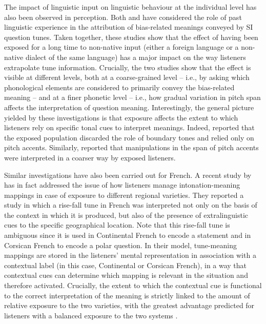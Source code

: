 \documentclass[output=paper,colorlinks,citecolor=brown]{langscibook}
\begin{document}
The impact of linguistic input on linguistic behaviour at the individual level has also been observed in perception. Both \citet{Orrico+2020} and \citet{orrico2022} have considered the role of past linguistic experience in the attribution of bias-related meanings conveyed by SI question tunes. Taken together, these studies show that the effect of having been exposed for a long time to non-native input (either a foreign language or a non-native dialect of the same language) has a major impact on the way listeners extrapolate tune information. Crucially, the two studies show that the effect is visible at different levels, both at a coarse-grained level – i.e., by asking which phonological elements are considered to primarily convey the bias-related meaning – and at a finer phonetic level – i.e., how gradual variation in pitch span affects the interpretation of question meaning. Interestingly, the general picture yielded by these investigations is that exposure affects the extent to which listeners rely on specific tonal cues to interpret meanings. Indeed, \citet{orrico2022} reported that the exposed population discarded the role of boundary tones and relied only on pitch accents. Similarly, \citet{Orrico+2020} reported that manipulations in the span of pitch accents were interpreted in a coarser way by exposed listeners.

Similar investigations have also been carried out for French. A recent study by \citet{portesgerman2019} has in fact addressed the issue of how listeners manage intonation-meaning mappings in case of exposure to different regional varieties. They reported a study in which a rise-fall tune in French was interpreted not only on the basis of the context in which it is produced, but also of the presence of extralinguistic cues to the specific geographical location. Note that this rise-fall tune is ambiguous since it is used in Continental French to encode a statement and in Corsican French to encode a polar question. In their model, tune-meaning mappings are stored in the listeners' mental representation in association with a contextual label (in this case, Continental or Corsican French), in a way that contextual cues can determine which mapping is relevant in the situation and therefore activated. Crucially, the extent to which the contextual cue is functional to the correct interpretation of the meaning is strictly linked to the amount of relative exposure to the two varieties, with the greatest advantage predicted for listeners with a balanced exposure to the two systems \citep{germanportes2020}.
\end{document}
